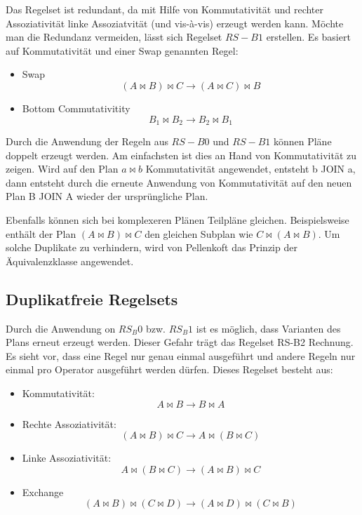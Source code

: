 Das Regelset ist redundant, da mit Hilfe von Kommutativität und rechter Assoziativität linke Assoziatvität (und vis-à-vis) erzeugt werden kann. Möchte man die Redundanz vermeiden, lässt sich Regelset $RS-B1$ erstellen. Es basiert auf Kommutativität und einer Swap genannten Regel:

\begin{itemize}
\item Swap $$ (A \Join B) \Join C \to (A \Join C) \Join B $$
\item Bottom Commutativitity $$ B_1 \Join B_2 \to B_2 \Join B_1$$
\end{itemize}


Durch die Anwendung der Regeln aus $RS-B0$ und $RS-B1$ können Pläne doppelt erzeugt werden. Am einfachsten ist dies an Hand von Kommutativität zu zeigen. Wird auf den Plan $a \Join b$ Kommutativität angewendet, entsteht b JOIN a, dann entsteht durch  die erneute Anwendung von Kommutativität auf den neuen Plan B JOIN A wieder der ursprüngliche Plan.

Ebenfalls können sich bei komplexeren Plänen     Teilpläne gleichen. Beispielsweise enthält der Plan $(A \Join B) \Join C$ den gleichen Subplan wie $C \Join (A \Join B)$. Um solche Duplikate zu verhindern, wird von Pellenkoft das Prinzip der Äquivalenzklasse angewendet.



\subsection{Duplikatfreie Regelsets}
Durch die Anwendung on $RS_B0$ bzw. $RS_B1$ ist es möglich, dass Varianten des Plans erneut erzeugt werden. Dieser Gefahr trägt das Regelset RS-B2 Rechnung. Es sieht vor, dass eine Regel nur genau einmal ausgeführt und andere Regeln nur einmal pro Operator ausgeführt werden dürfen. Dieses Regelset besteht aus:


\begin{itemize}
\item Kommutativität: $$ A \Join B \to B \Join A$$
\item Rechte Assoziativität: $$(A \Join B) \Join C \to A \Join (B \Join C) $$
\item Linke Assoziativität: $$A \Join (B \Join C) \to (A \Join B) \Join C$$

\item Exchange $$(A \Join B) \Join (C \Join D) \to (A \Join D) \Join (C \Join B) $$
\end{itemize}



